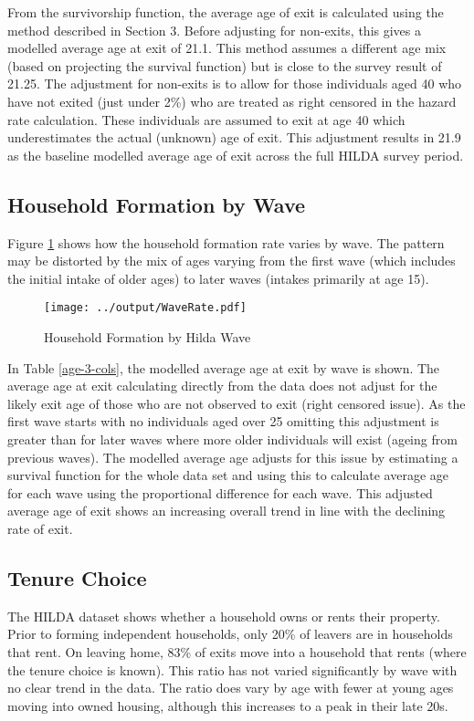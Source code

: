 \documentclass[12pt]{article}
\begin{document}
From the survivorship function, the average age of exit is calculated using the method described in Section 3. Before adjusting for non-exits, this gives a modelled average age at exit of 21.1. This method assumes a different age mix (based on projecting the survival function) but is close to the survey result of 21.25. The adjustment for non-exits is to allow for those individuals aged 40 who have not exited (just under 2\%) who are treated as right censored in the hazard rate calculation. These individuals are assumed to exit at age 40 which underestimates the actual (unknown) age of exit. This adjustment results in 21.9 as the baseline modelled average age of exit across the full HILDA survey period.

\subsection{Household Formation by Wave}

Figure \ref{ExitbyWave} shows how the household formation rate varies by wave. The pattern may be distorted by the mix of ages varying from the first wave (which includes the initial intake of older ages) to later waves (intakes primarily at age 15).

\begin{figure}[htpb]
  \caption{Household Formation by Hilda Wave}
  \label{ExitbyWave}
  \centering
  \texttt{[image: ../output/WaveRate.pdf]}
\end{figure}

In Table \ref{age-3-cols}, the modelled average age at exit by wave is shown. The average age at exit calculating directly from the data does not adjust for the likely exit age of those who are not observed to exit (right censored issue). As the first wave starts with no individuals aged over 25 omitting this adjustment is greater than for later waves where more older individuals will exist (ageing from previous waves). The modelled average age adjusts for this issue by estimating a survival function for the whole data set and using this to calculate average age for each wave using the proportional difference for each wave. This adjusted average age of exit shows an increasing overall trend in line with the declining rate of exit.



\subsection{Tenure Choice}
The HILDA dataset shows whether a household owns or rents their property. Prior to forming independent households, only 20\% of leavers are in households that rent.  On leaving home, 83\% of exits move into a household that rents (where the tenure choice is known). This ratio has not varied significantly by wave with no clear trend in the data. The ratio does vary by age with fewer at young ages moving into owned housing, although this increases to a peak in their late 20s.
\end{document}
